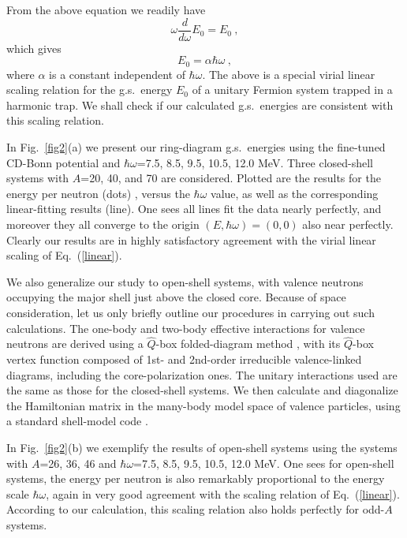 \documentclass[twocolumn,preprintnumbers,superscriptaddress]{revtex4}
\begin{document}
From the above equation we readily have
\begin{equation}
\omega \frac{d}{d\omega}E_0=E_0~,
\end{equation}
which gives
\begin{equation}
 E_0=\alpha \hbar \omega ~, \label{linear}
\end{equation}
where $\alpha$ is a constant independent of $\hbar \omega$.
The above is a special virial linear scaling relation for the g.s.~energy $E_0$
of a unitary Fermion system trapped in a harmonic trap.
We shall check if our calculated
g.s.~energies are consistent with this scaling relation.

In Fig.~\ref{fig2}(a) we present our ring-diagram
g.s.~energies using the fine-tuned CD-Bonn potential
and $\hbar\omega$=7.5, 8.5, 9.5, 10.5, 12.0 MeV.
Three closed-shell systems with $A$=20, 40, and 70 are considered.
Plotted are the results for the energy per neutron (dots) ,
versus the $\hbar\omega$ value,
as well as the corresponding linear-fitting results (line).
One sees all lines fit the data nearly perfectly,
and moreover   they all converge to
the origin $(E,\hbar\omega)=(0,0)$
also near perfectly. Clearly our results are in highly
satisfactory agreement with the virial linear scaling
of Eq.~(\ref{linear}).

We also generalize our study to open-shell systems,
with valence neutrons occupying the major shell just
above the closed core.
Because of space consideration, let us only briefly
outline our procedures in carrying out such  calculations.
The one-body and two-body effective interactions for valence neutrons
are derived
using a $\hat{Q}$-box folded-diagram method \cite{vlowk3,Kuo1990},
with its $\hat{Q}$-box vertex function  composed of
1st- and 2nd-order irreducible valence-linked diagrams,
including the core-polarization ones.
The unitary interactions used are the same as those
for the closed-shell systems.
We then calculate and diagonalize the Hamiltonian matrix
in the many-body model space of valence particles,
using a standard shell-model code \cite{nushellx}.

In Fig.~\ref{fig2}(b)
we exemplify the results of open-shell systems
using the systems
with $A$=26, 36, 46
and $\hbar\omega$=7.5, 8.5, 9.5, 10.5, 12.0 MeV.
One sees for open-shell systems, the energy per
neutron is also remarkably proportional to the energy scale $\hbar\omega$,
again in very good agreement with the scaling relation of Eq.~(\ref{linear}).
According to our calculation, this scaling relation also
holds perfectly for odd-$A$ systems.
\end{document}

